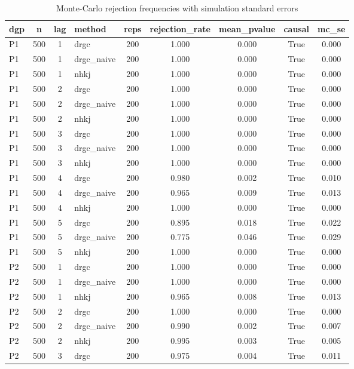 \begin{table}[htbp]
\centering
\caption{Monte-Carlo rejection frequencies with simulation standard errors}
\label{tab:mcsummary}
\small
\begin{tabular}{lcclccccc}
\toprule
dgp & n & lag & method & reps & rejection\_rate & mean\_pvalue & causal & mc\_se \\
\midrule
P1 & 500 & 1 & drgc & 200 & 1.000 & 0.000 & True & 0.000 \\
P1 & 500 & 1 & drgc\_naive & 200 & 1.000 & 0.000 & True & 0.000 \\
P1 & 500 & 1 & nhkj & 200 & 1.000 & 0.000 & True & 0.000 \\
P1 & 500 & 2 & drgc & 200 & 1.000 & 0.000 & True & 0.000 \\
P1 & 500 & 2 & drgc\_naive & 200 & 1.000 & 0.000 & True & 0.000 \\
P1 & 500 & 2 & nhkj & 200 & 1.000 & 0.000 & True & 0.000 \\
P1 & 500 & 3 & drgc & 200 & 1.000 & 0.000 & True & 0.000 \\
P1 & 500 & 3 & drgc\_naive & 200 & 1.000 & 0.000 & True & 0.000 \\
P1 & 500 & 3 & nhkj & 200 & 1.000 & 0.000 & True & 0.000 \\
P1 & 500 & 4 & drgc & 200 & 0.980 & 0.002 & True & 0.010 \\
P1 & 500 & 4 & drgc\_naive & 200 & 0.965 & 0.009 & True & 0.013 \\
P1 & 500 & 4 & nhkj & 200 & 1.000 & 0.000 & True & 0.000 \\
P1 & 500 & 5 & drgc & 200 & 0.895 & 0.018 & True & 0.022 \\
P1 & 500 & 5 & drgc\_naive & 200 & 0.775 & 0.046 & True & 0.029 \\
P1 & 500 & 5 & nhkj & 200 & 1.000 & 0.000 & True & 0.000 \\
P2 & 500 & 1 & drgc & 200 & 1.000 & 0.000 & True & 0.000 \\
P2 & 500 & 1 & drgc\_naive & 200 & 1.000 & 0.000 & True & 0.000 \\
P2 & 500 & 1 & nhkj & 200 & 0.965 & 0.008 & True & 0.013 \\
P2 & 500 & 2 & drgc & 200 & 1.000 & 0.000 & True & 0.000 \\
P2 & 500 & 2 & drgc\_naive & 200 & 0.990 & 0.002 & True & 0.007 \\
P2 & 500 & 2 & nhkj & 200 & 0.995 & 0.003 & True & 0.005 \\
P2 & 500 & 3 & drgc & 200 & 0.975 & 0.004 & True & 0.011 \\

\end{tabular}
\end{table}
